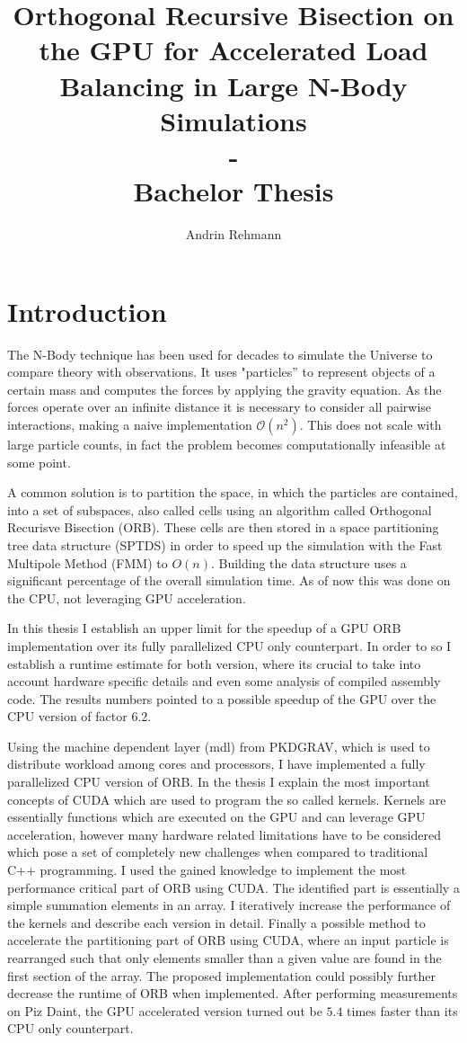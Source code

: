 \documentclass[]{article}
\title{Orthogonal Recursive Bisection on the GPU for Accelerated Load Balancing in Large N-Body Simulations \\ - \\ Bachelor Thesis}
\author{Andrin Rehmann}
\begin{document}
\maketitle

\newpage

\tableofcontents

\newpage
\section{Introduction}


The N-Body technique has been used for decades to simulate the Universe to compare theory with observations. It uses "particles'' to represent objects of a certain mass and computes the forces by applying the gravity equation. As the forces operate over an infinite distance it is necessary to consider all pairwise interactions, making a naive implementation $\mathcal{O}(n^2)$. This does not scale with large particle counts, in fact the problem becomes computationally infeasible at some point.

A common solution is to partition the space, in which the particles are contained, into a set of subspaces, also called cells using an algorithm called Orthogonal Recurisve Bisection (ORB). These cells are then stored in a space partitioning tree data structure (SPTDS) in order to speed up the simulation with the Fast Multipole Method (FMM) to $O(n)$. 
Building the data structure uses a significant percentage of the overall simulation time. As of now this was done on the CPU, not leveraging GPU acceleration.
 
In this thesis I establish an upper limit for the speedup of a GPU ORB implementation over its fully parallelized CPU only counterpart. In order to so I establish a runtime estimate for both version, where its crucial to take into account hardware specific details and even some analysis of compiled assembly code. The results numbers pointed to a possible speedup of the GPU over the CPU version of factor $6.2$.

Using the machine dependent layer (mdl) from PKDGRAV, which is used to distribute workload among cores and processors, I have implemented a fully parallelized CPU version of ORB. In the thesis I explain the most important concepts of CUDA which are used to program the so called kernels. Kernels are essentially functions which are executed on the GPU and can leverage GPU acceleration, however many hardware related limitations have to be considered which pose a set of completely new challenges when compared to traditional C++ programming.
I used the gained knowledge to implement the most performance critical part of ORB using CUDA. The identified part is essentially a simple summation elements in an array. I iteratively increase the performance of the kernels and describe each version in detail. Finally a possible method to accelerate the partitioning part of ORB using CUDA, where an input particle is rearranged such that only elements smaller than a given value are found in the first section of the array. The proposed implementation could possibly further decrease the runtime of ORB when implemented.
After performing measurements on Piz Daint, the GPU accelerated version turned out be $5.4$ times faster than its CPU only counterpart. 
\end{document}
